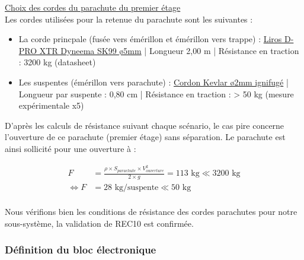 \underline{Choix des cordes du parachute du premier étage}\\
Les cordes utilisées pour la retenue du parachute sont les suivantes :
\begin{itemize}
    \item La corde princpale (fusée vers émérillon et émérillon vers trappe) : \href{https://www.kanirope.fr/liros-d-pro-xtr-dyneema-sk99-5mm-au-metre-couleur-argent-12x-tressee}{Liros D-PRO XTR Dyneema SK99 ø5mm} | Longueur 2,00 m | Résistance en traction : 3200 kg (datasheet)
    \item Les suspentes (émérillon vers parachute) : \href{https://www.sierrafoxhobbies.com/fr/2375-cordon-kevlar-2-mm.html}{Cordon Kevlar ø2mm ignifugé} | Longueur par suspente : 0,80 cm | Résistance en traction : > 50 kg (mesure expérimentale x5) \\
\end{itemize}

D'après les calculs de résistance suivant chaque scénario, le cas pire concerne l'ouverture de ce parachute (premier étage) sans séparation.
Le parachute est ainsi sollicité pour une ouverture à :

\begin{equation}
\begin{aligned}
    F &= \frac{\rho \times S_{parachute} \times V_{ouverture}^2}{2 \times g} = 113 \text{ kg} \ll 3200 \text{ kg} \\
    \Leftrightarrow F &= 28 \text{ kg/suspente} \ll 50 \text{ kg}\\
\end{aligned}
\end{equation}

Nous vérifions bien les conditions de résistance des cordes parachutes pour notre sous-système, la validation de REC10 est confirmée.



\newpage

\subsubsection{Définition du bloc électronique}
\label{subsec:defblocelec1}

